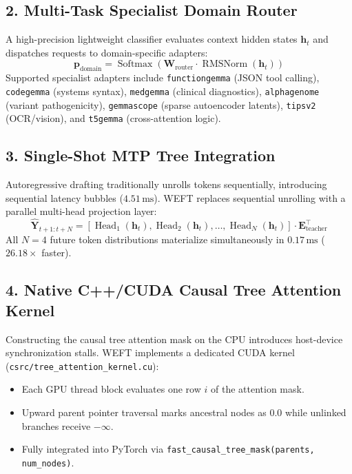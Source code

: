 \documentclass[11pt,a4paper]{article}
\begin{document}
\subsection{2. Multi-Task Specialist Domain Router}
A high-precision lightweight classifier evaluates context hidden states $\mathbf{h}_t$ and dispatches requests to domain-specific adapters:
\begin{equation}
\mathbf{p}_{\text{domain}} = \operatorname{Softmax}\left(\mathbf{W}_{\text{router}} \cdot \operatorname{RMSNorm}(\mathbf{h}_t)\right)
\end{equation}
Supported specialist adapters include \texttt{functiongemma} (JSON tool calling), \texttt{codegemma} (systems syntax), \texttt{medgemma} (clinical diagnostics), \texttt{alphagenome} (variant pathogenicity), \texttt{gemmascope} (sparse autoencoder latents), \texttt{tipsv2} (OCR/vision), and \texttt{t5gemma} (cross-attention logic).

\subsection{3. Single-Shot MTP Tree Integration}
Autoregressive drafting traditionally unrolls tokens sequentially, introducing sequential latency bubbles ($4.51\,\text{ms}$). WEFT replaces sequential unrolling with a parallel multi-head projection layer:
\begin{equation}
\hat{\mathbf{Y}}_{t+1:t+N} = \left[ \operatorname{Head}_1(\mathbf{h}_t), \operatorname{Head}_2(\mathbf{h}_t), \dots, \operatorname{Head}_N(\mathbf{h}_t) \right] \cdot \mathbf{E}_{\text{teacher}}^\top
\end{equation}
All $N=4$ future token distributions materialize simultaneously in $0.17\,\text{ms}$ ($26.18\times$ faster).

\subsection{4. Native C++/CUDA Causal Tree Attention Kernel}
Constructing the causal tree attention mask on the CPU introduces host-device synchronization stalls. WEFT implements a dedicated CUDA kernel (\texttt{csrc/tree\_attention\_kernel.cu}):
\begin{itemize}
    \item Each GPU thread block evaluates one row $i$ of the attention mask.
    \item Upward parent pointer traversal marks ancestral nodes as $0.0$ while unlinked branches receive $-\infty$.
    \item Fully integrated into PyTorch via \texttt{fast\_causal\_tree\_mask(parents, num\_nodes)}.
\end{itemize}
\end{document}
